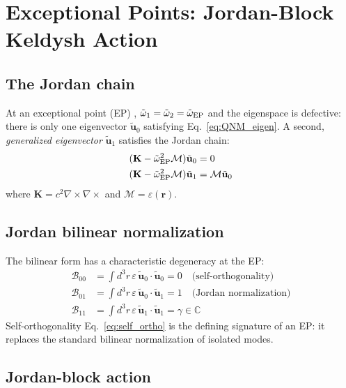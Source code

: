 \documentclass[12pt]{article}
\newcommand{\EP}{{\rm EP}}
\newcommand{\tu}{\tilde{\mathbf{u}}}
\newcommand{\tomega}{\tilde{\omega}}
\begin{document}
\section{Exceptional Points: Jordan-Block Keldysh Action}
\label{sec:ep}

\subsection{The Jordan chain}

At an exceptional point (EP) \cite{Heiss2012,Ozdemir2019}, $\tomega_1=\tomega_2=\tomega_\EP$ and
the eigenspace is defective: there is only one eigenvector
$\tu_0$ satisfying Eq.~\eqref{eq:QNM_eigen}.  A second,
\emph{generalized eigenvector} $\tu_1$ satisfies the Jordan chain:
\begin{align}
  (\mathbf{K}-\tomega_\EP^2\mathcal{M})\tu_0 &= 0
  \label{eq:jordan_chain_1}\\
  (\mathbf{K}-\tomega_\EP^2\mathcal{M})\tu_1 &= \mathcal{M}\tu_0
  \label{eq:jordan_chain_2}
\end{align}
where $\mathbf{K}=c^2\nabla\times\nabla\times$ and
$\mathcal{M}=\varepsilon(\mathbf{r})$.

\subsection{Jordan bilinear normalization}

The bilinear form has a characteristic degeneracy at the EP:
\begin{align}
  \mathcal{B}_{00} &=
  \int d^3r\,\varepsilon\,\tu_0\cdot\tu_0 = 0
  \quad\text{(self-orthogonality)}
  \label{eq:self_ortho}\\
  \mathcal{B}_{01} &=
  \int d^3r\,\varepsilon\,\tu_0\cdot\tu_1 = 1
  \quad\text{(Jordan normalization)}
  \label{eq:jordan_norm}\\
  \mathcal{B}_{11} &=
  \int d^3r\,\varepsilon\,\tu_1\cdot\tu_1 = \gamma\in\mathbb{C}
  \label{eq:aux_norm}
\end{align}
Self-orthogonality Eq.~\eqref{eq:self_ortho} is the defining
signature of an EP: it replaces the standard bilinear normalization of
isolated modes.

\subsection{Jordan-block action}
\end{document}

